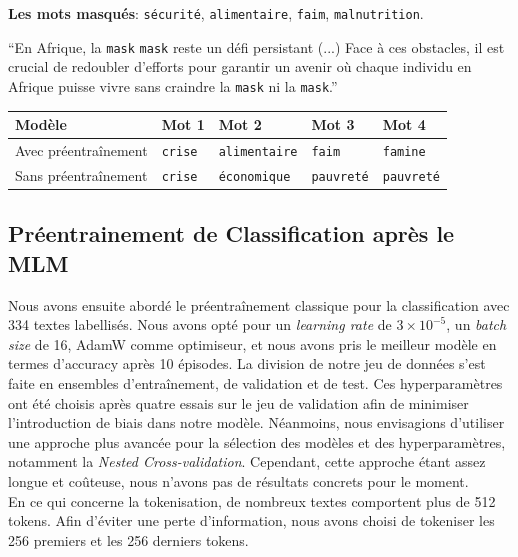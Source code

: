 \documentclass{article}
\begin{document}
\textbf{Les mots masqués}: \texttt{sécurité}, \texttt{alimentaire}, \texttt{faim}, \texttt{malnutrition}.\\

\begin{displayquote}
``En Afrique, la \texttt{\textlangle{}mask\textrangle{}} \texttt{\textlangle{}mask\textrangle{}} reste un défi persistant (...) Face à ces obstacles, il est crucial de redoubler d'efforts pour garantir un avenir où chaque individu en Afrique puisse vivre sans craindre la \texttt{\textlangle{}mask\textrangle{}} ni la \texttt{\textlangle{}mask\textrangle{}}.''
\end{displayquote}

\begin{tabular}{|l|l|l|l|l|}
\hline
\textbf{Modèle} & \textbf{Mot 1} & \textbf{Mot 2} & \textbf{Mot 3} & \textbf{Mot 4} \\ \hline
Avec préentraînement & \texttt{crise} & \texttt{alimentaire} & \texttt{faim} & \texttt{famine} \\ \hline
Sans préentraînement & \texttt{crise} & \texttt{économique} & \texttt{pauvreté} & \texttt{pauvreté} \\ \hline
\end{tabular}


\subsection{Préentrainement de Classification après le MLM}

Nous avons ensuite abordé le préentraînement classique pour la classification avec 334 textes labellisés. Nous avons opté pour un \textit{learning rate} de $3 \times 10^{-5}$, un \textit{batch size} de 16, AdamW comme optimiseur, et nous avons pris le meilleur modèle en termes d'accuracy après 10 épisodes. La division de notre jeu de données s'est faite en ensembles d'entraînement, de validation et de test. Ces hyperparamètres ont été choisis après quatre essais sur le jeu de validation afin de minimiser l'introduction de biais dans notre modèle. Néanmoins, nous envisagions d'utiliser une approche plus avancée pour la sélection des modèles et des hyperparamètres, notamment la \textit{Nested Cross-validation}. Cependant, cette approche étant assez longue et coûteuse, nous n'avons pas de résultats concrets pour le moment.\\

En ce qui concerne la tokenisation, de nombreux textes comportent plus de 512 tokens. Afin d'éviter une perte d'information, nous avons choisi de tokeniser les 256 premiers et les 256 derniers tokens.
\end{document}
